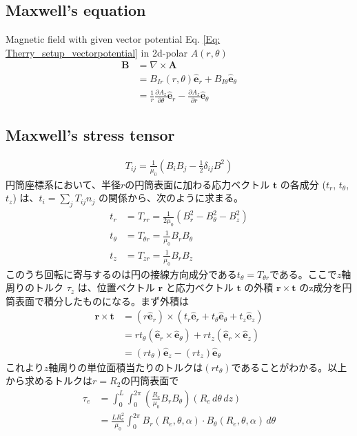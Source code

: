 \documentclass[a4paper, 11pt]{article}
\begin{document}
\subsection{Maxwell's equation}
Magnetic field with given vector potential Eq. \eqref{Eq: Therry_setup_vectorpotential} in 2d-polar $A(r,\theta)$
\begin{align}
    \bm{B} & = \nabla \times \bm{A} \\
    & = B_{Ir}(r,\theta)\hat{\bm{e}}_{r} + B_{I\theta}\hat{\bm{e}}_{\theta} \\
    & = \frac{1}{r} \frac{\partial A_{z}}{\partial \theta}\hat{\bm{e}}_{r} - \frac{\partial A_{z}}{\partial r}\hat{\bm{e}}_{\theta}\label{Eq: App_magneticfield}
\end{align}

\subsection{Maxwell's stress tensor}
\begin{align}
    T_{ij} = \frac{1}{\mu_0} \left(B_iB_j - \frac{1}{2}\delta_{ij}B^2\right)
\end{align}
円筒座標系において、半径$r$の円筒表面に加わる応力ベクトル $\bm{t}$ の各成分 ($t_r$, $t_\theta$, $t_z$) は、$t_i = \sum_j T_{ij} n_j$ の関係から、次のように求まる。
\begin{align*}
    t_r &= T_{rr} = \frac{1}{2\mu_0}(B_r^2 - B_\theta^2 - B_z^2) \\
    t_\theta &= T_{\theta r} = \frac{1}{\mu_0}B_r B_\theta \\
    t_z &= T_{zr} = \frac{1}{\mu_0}B_r B_z
\end{align*}
このうち回転に寄与するのは円の接線方向成分である$t_\theta = T_{\theta r}$である。ここで$z$軸周りのトルク $\tau_z$ は、位置ベクトル $\bm{r}$ と応力ベクトル $\bm{t}$ の外積 $\mathbf{r} \times \mathbf{t}$ のz成分を円筒表面で積分したものになる。まず外積は
\begin{align}
     \bm{r} \times \bm{t} & = (r \mathbf{\hat{e}}_r) \times (t_r \mathbf{\hat{e}}_r + t_\theta \mathbf{\hat{e}}_\theta + t_z \mathbf{\hat{e}}_z)\\
     & = r t_\theta (\mathbf{\hat{e}}_r \times \mathbf{\hat{e}}_\theta) + r t_z (\mathbf{\hat{e}}_r \times \mathbf{\hat{e}}_z) \\
     &= (r t_\theta) \mathbf{\hat{e}}_z - (r t_z) \mathbf{\hat{e}}_\theta
\end{align}
これより$z$軸周りの単位面積当たりのトルクは$(r t_\theta)$であることがわかる。以上から求めるトルクは$r=R_2$の円筒表面で
\begin{align}
    \tau_e & = \int_0^L \int_0^{2\pi} \left( \frac{R_e}{\mu_0} B_r B_\theta \right) (R_e \, d\theta \, dz)\\
    & = \frac{L R_e^2}{\mu_0} \int_0^{2\pi} B_r(R_e, \theta, \alpha) \cdot B_\theta(R_e, \theta, \alpha) \, d\theta\label{Eq: App_magnetictorque}
\end{align}
\end{document}
